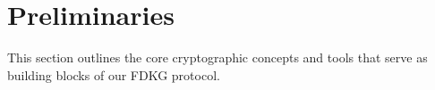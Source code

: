 \documentclass[lettersize,journal]{IEEEtran}
\theoremstyle{definition}
\begin{document}
\newcommand{\ProofPDInformal}{"Given $\TotalA{}, \PartialDecryptionFrom{i}, \PartialPublicKey{i}$, I know a partial decryption key $\PartialSecretKey{i}$ s.t. $\PartialPublicKey{i} = \PartialSecretKey{i} G$ and $\PartialDecryptionFrom{i} = \PartialSecretKey{i} \TotalA{}$"}

\newcommand{\ProofPDS}[2]{\ensuremath{\textrm{PROOF}_{\SharePartialDecryptionFromTo{#1}{#2}}}}

\newcommand{\ProofPDSInformal}{"Given $\SharePartialDecryptionFromTo{j}{i}, \EncryptedSharePartialSecretKey{j}{i}, \TotalA$, I know a secret key $\PartySecretKey{i}$ s.t. $\SharePartialDecryptionFromTo{j}{i} = \TotalA  \SharePartialSecretKey{j}{i}$ where $\SharePartialSecretKey{j}{i} = \DecryptionUsingOf{\PartySecretKey{i}}{\EncryptedSharePartialSecretKey{j}{i}}$"}


\newcommand{\Ballot}[1]{\ensuremath{B_{#1}}}

\newcommand{\Generator}[1]{\ensuremath{H_{#1}}}
\newcommand{\BlindingFactor}[1]{\ensuremath{r_{i}}}
\newcommand{\Vote}[1]{\ensuremath{v_{#1}}}

\newcommand{\GuardianSetOf}[1]{\ensuremath{\mathbb{G}_{#1}}}
\newcommand{\TotalA}{\ensuremath{C1}}
\newcommand{\TotalB}{\ensuremath{C2}}
\newcommand{\BallotA}[1]{\ensuremath{C1_{#1}}}
\newcommand{\BallotB}[1]{\ensuremath{C2_{#1}}}

\newcommand{\G}{\ensuremath{G}}


\newcommand{\SharePartialDecryptionFromTo}[2]{\ensuremath{[\mathrm{PD}_{#1}]_{#2}}}

\newcommand{\PartialDecryptionFrom}[1]{\ensuremath{\mathrm{PD}_{#1}}}


\section{Preliminaries}\label{sec:preliminaries}

This section outlines the core cryptographic concepts and tools that serve as building blocks of our FDKG protocol.
\end{document}

